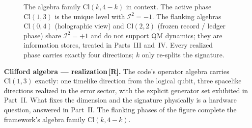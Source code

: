 \documentclass[11pt,a4paper]{article}
\newcommand{\Rmark}{\textcolor{green!50!black}{\textbf{[R]}}}
\providecommand{\Cl}[1]{\mathrm{Cl}(#1)}
\begin{document}
\begin{figure}[h]
\centering
{}
\caption{The algebra family $\Cl{k,4-k}$ in context. The active phase $\Cl{1,3}$ is the unique level with $\mathcal{I}^2=-1$. The flanking algebras $\Cl{0,4}$ (holographic view) and $\Cl{2,2}$ (frozen record / ledger phase) share $\mathcal{I}^2=+1$ and do not support QM dynamics; they are information stores, treated in Parts~III and~IV. Every realized phase carries exactly four directions; $k$ only re-splits the signature.}
\label{fig:clifford_phases}
\end{figure}

\begin{mdframed}[backgroundcolor=Rbg,linecolor=Rcolor,linewidth=1.5pt]
\textbf{Clifford algebra --- realization\,\Rmark.}\quad
The code's operator algebra carries $\Cl{1,3}$ exactly: one timelike direction from the logical qubit, three spacelike directions realized in the error sector, with the explicit generator set exhibited in Part~II. What fixes the dimension and the signature physically is a hardware question, answered in Part~II. The flanking phases of the figure complete the framework's algebra family $\Cl{k,4-k}$.
\end{mdframed}
\end{document}
